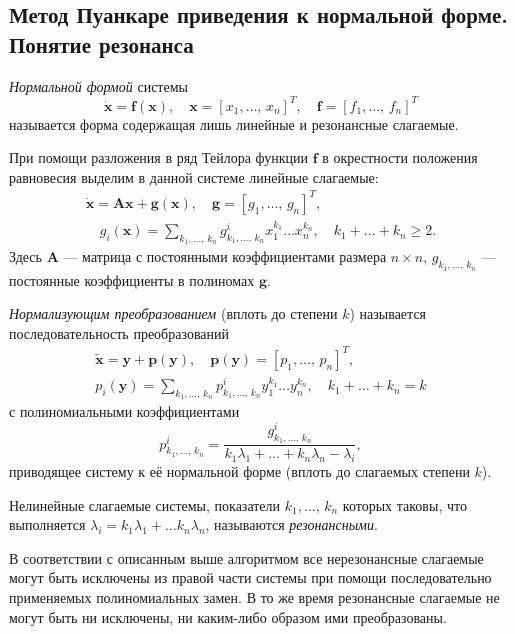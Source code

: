 \documentclass[a4paper]{article}
\begin{document}
\subsection{Метод Пуанкаре приведения к нормальной форме.
Понятие резонанса}
\begin{dfn}
	\emph{Нормальной формой} системы
	\[
		\dot{\mathbf{x}}=\mathbf{f}(\mathbf{x}),\quad
		\mathbf{x}=[x_1,\ldots,\,x_n]^T, \quad 
		\mathbf{f}=[f_1,\ldots,\,f_n]^T
	\]
	называется форма содержащая лишь линейные и резонансные слагаемые.
\end{dfn}
При помощи разложения в ряд Тейлора функции   $\mathbf{f}$ в окрестности
положения равновесия выделим в данной системе линейные слагаемые:
\begin{gather*}
	\dot{\mathbf{x}}= \mathbf{Ax}+\boldsymbol{g}(\mathbf{x}),\quad
	\boldsymbol{g}=[g_1,\ldots,\,g_n]^T,\\ \quad g_i(\mathbf{x})=
	\sum_{k_1,\ldots,\,k_n}^{} g_{k_1,\ldots,\,k_n}^i x_1^{k_1}\ldots
	x_n ^{k_n},\quad k_1+\ldots+k_n \ge 2
.\end{gather*}
Здесь $\mathbf{A}$ --- матрица с постоянными коэффициентами размера $n \times n$,
$g_{k_1,\ldots,\,k_n}$ --- постоянные коэффициенты в полиномах $\boldsymbol{g}$.
\begin{dfn}
	\emph{Нормализующим преобразованием} (вплоть до степени $k$) 
	называется последовательность преобразований
	\begin{gather*}
		\tilde{\mathbf{x}}=\mathbf{y}+ \mathbf{p}(\mathbf{y}),\quad
		\mathbf{p}(\mathbf{y})=[p_1,\ldots,\,p_n]^T,\\
		p_i(\mathbf{y})= \sum_{k_1,\ldots,\,k_n}^{} p^i_{k_1,\ldots,\,k_n}
		y_1^{k_1}\ldots y_n^{k_n},\quad k_1+\ldots+k_n=k
	\end{gather*}
	с полиномиальными коэффициентами
	\[
	p_{k_1,\ldots,\,k_n}^i=\frac{g_{k_1,\ldots,\,k_n}^i}{k_1 \lambda_1+
	\ldots+k_n \lambda_n-\lambda_i}
	,\] 
	приводящее систему к её нормальной форме (вплоть до слагаемых степени
	$k$).
\end{dfn}
\begin{dfn}
	Нелинейные слагаемые системы, показатели $k_1,\ldots,\,k_n$ которых
	таковы, что выполняется $\lambda_i=k_1 \lambda_1+\ldots k_n \lambda_n$,
	называются \emph{резонансными}.
\end{dfn}
В соответствии с описанным выше алгоритмом все нерезонансные слагаемые могут
быть исключены из правой части системы при помощи последовательно применяемых
полиномиальных замен. В то же время резонансные слагаемые не могут быть ни
исключены, ни каким-либо образом ими преобразованы.
\end{document}
